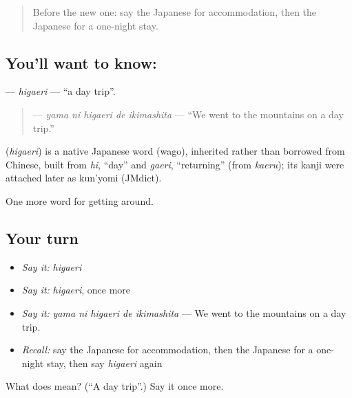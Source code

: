 \begin{quote}
Before the new one: say the Japanese for accommodation, then the Japanese for a one-night stay.
\end{quote}

\subsection*{You'll want to know: }
\textbf{} — \emph{higaeri} — \textquotedblleft{}a day trip\textquotedblright{}.

\begin{quote}
\textbf{  } — \emph{yama ni higaeri de ikimashita} — \textquotedblleft{}We went to the mountains on a day trip.\textquotedblright{}
\end{quote}

\begin{cousinweb}
\textbf{} (\emph{higaeri}) is a native Japanese word (wago), inherited rather than borrowed from Chinese, built from \emph{hi}, \textquotedblleft{}day\textquotedblright{} and \emph{gaeri}, \textquotedblleft{}returning\textquotedblright{} (from \emph{kaeru}); its kanji were attached later as kun'yomi (JMdict).
\end{cousinweb}

\begin{grammarlens}[title={What you've built}]
One more word for getting around.
\end{grammarlens}

\subsection*{Your turn}
\begin{itemize}
\raggedright
  \item \emph{Say it:} \emph{higaeri}
  \item \emph{Say it:} \emph{higaeri}, once more
  \item \emph{Say it:} \emph{yama ni higaeri de ikimashita} — We went to the mountains on a day trip.
  \item \emph{Recall:} say the Japanese for accommodation, then the Japanese for a one-night stay, then say \emph{higaeri} again
\end{itemize}

\begin{tcolorbox}[breakable,colback=teal!4,colframe=teal!35!black,title={Before you move on}]
What does  mean? (\textquotedblleft{}A day trip\textquotedblright{}.) Say it once more.
\end{tcolorbox}
